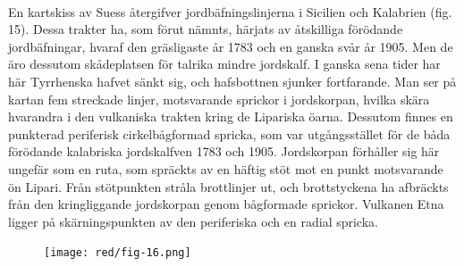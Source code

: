 \documentclass[a4paper, 12pt, oneside, swedish]{article}
\begin{document}
\paragraph{}
En kartskiss av Suess återgifver jordbäfningslinjerna i Sicilien och Kalabrien (fig. 15). Dessa trakter ha, som förut nämnts, härjats av åtskilliga förödande jordbäfningar, hvaraf den gräsligaste år 1783 och en ganska svår år 1905. Men de äro dessutom skådeplatsen för talrika mindre jordskalf. I ganska sena tider har här Tyrrhenska hafvet sänkt sig, och hafsbottnen sjunker fortfarande. Man ser på kartan fem streckade linjer, motsvarande sprickor i jordskorpan, hvilka skära hvarandra i den vulkaniska trakten kring de Lipariska öarna. Dessutom finnes en punkterad periferisk cirkelbågformad spricka, som var utgångsstället för de båda förödande kalabriska jordskalfven 1783 och 1905. Jordskorpan förhåller sig här ungefär som en ruta, som spräckts av en häftig stöt mot en punkt motsvarande ön Lipari. Från stötpunkten stråla brottlinjer ut, och brottstyckena ha afbräckts från den kringliggande jordskorpan genom bågformade sprickor. Vulkanen Etna ligger på skärningspunkten av den periferiska och en radial spricka.

\begin{figure}[H]
\centering
\texttt{[image: red/fig-16.png]}
\caption{}
\end{figure}
\end{document}
